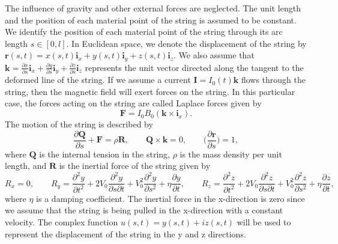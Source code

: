 \documentclass{article}
\begin{document}
The influence of gravity and other external forces are neglected. The unit length and the position of each material point of the string is assumed to be constant. We identify the position of each material point of the string through its arc length $s \in [0,l]$. In Euclidean space, we denote the displacement of the string by $\textbf{r}(s,t) = x(s,t) \textbf{i}_x + y(s,t) \textbf{i}_y + z(s,t) \textbf{i}_z$. We also assume that $\textbf{k} = \frac{\partial x }{\partial s} \textbf{i}_x + \frac{\partial y }{\partial s} \textbf{i}_y + \frac{\partial z }{\partial s} \textbf{i}_z$ represents the unit vector directed along the tangent to the deformed line of the string. If we assume a current $\textbf{I} = I_0(t) \textbf{k}$ flows through the string, then the magnetic field will exert forces on the string. In this particular case, the forces acting on the string are called Laplace forces given by
\begin{equation}
    \textbf{F} = I_0 B_0 (\textbf{k} \times \textbf{i}_x).
\end{equation}
The motion of the string is described by
\begin{equation}
    \frac{\partial \textbf{Q}}{\partial s} + \textbf{F} = \rho \textbf{R}, \qquad \textbf{Q} \times \textbf{k} = 0, \qquad \big( \frac{\partial \textbf{r}}{\partial s} \big) = 1,
\end{equation}
where $\textbf{Q}$ is the internal tension in the string, $\rho$ is the mass density per unit length, and $\textbf{R}$ is the inertial force of the string given by
\begin{equation}
    R_x = 0, \qquad R_y = \frac{\partial^2 y}{\partial t^2} + 2V_0 \frac{\partial^2 y}{\partial s \partial t} + V_0^2 \frac{\partial^2 y}{\partial s^2} + \eta \frac{\partial y}{\partial t}, \qquad R_z = \frac{\partial^2 z}{\partial t^2} + 2V_0 \frac{\partial^2 z}{\partial s \partial t} + V_0^2 \frac{\partial^2 z}{\partial s^2}+ \eta \frac{\partial z}{\partial t},
\end{equation}
where $\eta$ is a damping coefficient. The inertial force in the x-direction is zero since we assume that the string is being pulled in the x-direction with a constant velocity. The complex function $u(s,t) = y(s,t) + i z(s,t)$ will be used to represent the displacement of the string in the y and z directions.
\end{document}
